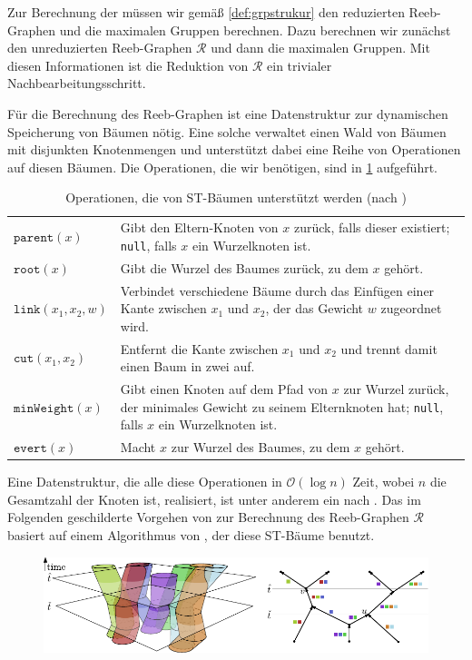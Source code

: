 Zur Berechnung der \GrpStruktur müssen wir gemäß \cref{def:grpstrukur} den reduzierten Reeb-Graphen und die maximalen Gruppen berechnen.
Dazu berechnen wir zunächst den unreduzierten Reeb-Graphen $\mathcal{R}$ und dann die maximalen Gruppen.
Mit diesen Informationen ist die Reduktion von $\mathcal{R}$ ein trivialer Nachbearbeitungsschritt.

Für die Berechnung des Reeb-Graphen ist eine Datenstruktur zur dynamischen Speicherung von Bäumen nötig.
Eine solche verwaltet einen Wald von Bäumen mit disjunkten Knotenmengen und unterstützt dabei eine Reihe von Operationen auf diesen Bäumen.
Die Operationen, die wir benötigen, sind in \cref{tbl:operationenST} aufgeführt.
\begin{table}[p]
	\Centering
	\caption{Operationen, die von ST-Bäumen unterstützt werden (nach \cite{parsaReeb})}\label{tbl:operationenST}
	\begin{tabular}{lp{}}
		\toprule
		$\mathtt{parent}(x)$ & Gibt den Eltern-Knoten von $x$ zurück, falls dieser existiert; \texttt{null}, falls $x$ ein Wurzelknoten ist.\\
		$\mathtt{root}(x)$ & Gibt die Wurzel des Baumes zurück, zu dem $x$ gehört.\\
		$\mathtt{link}(x_1,x_2,w)$ & Verbindet verschiedene Bäume durch das Einfügen einer Kante zwischen $x_1$ und $x_2$, der das Gewicht $w$ zugeordnet wird.\\
		$\mathtt{cut}(x_1,x_2)$ & Entfernt die Kante zwischen $x_1$ und $x_2$ und trennt damit einen Baum in zwei auf.\\
		$\mathtt{minWeight}(x)$ & Gibt einen Knoten auf dem Pfad von $x$ zur Wurzel zurück, der minimales Gewicht zu seinem Elternknoten hat; \texttt{null}, falls $x$ ein Wurzelknoten ist.\\
		$\mathtt{evert}(x)$ & Macht $x$ zur Wurzel des Baumes, zu dem $x$ gehört.\\
		\bottomrule
	\end{tabular}
\end{table}
Eine Datenstruktur, die alle diese Operationen in $\mathcal{O}(\log n)$ Zeit, wobei $n$ die Gesamtzahl der Knoten ist, realisiert, ist unter anderem ein  nach \textcite{dynamictrees}.
Das im Folgenden geschilderte Vorgehen von \textcite{buchin2015} zur Berechnung des Reeb-Graphen $\mathcal{R}$ basiert auf einem Algorithmus von \textcite{parsaReeb}, der diese ST-Bäume benutzt.

\begin{figure}[hbt]
	\Centering
	\includegraphics[width=.9\textwidth]{Bilder/manifold.pdf}
\end{figure}

